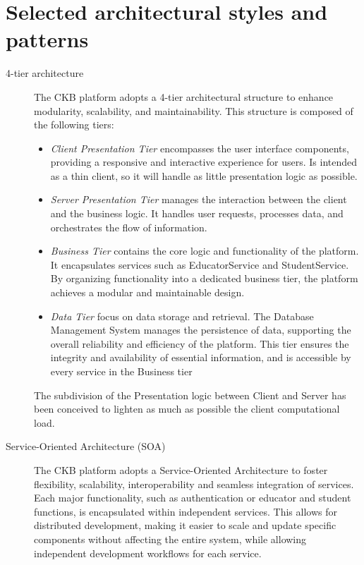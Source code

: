 \documentclass[11pt]{report}
\begin{document}
\section{Selected architectural styles and patterns} \label{sec:architectural_styles}
\begin{description}
    \item[4-tier architecture]
    The CKB platform adopts a 4-tier architectural structure to enhance modularity, scalability, and maintainability.
    This structure is composed of the following tiers:
    \begin{itemize}
        \item[1°] \emph{Client Presentation Tier} encompasses the user interface components, providing a responsive and interactive experience for users.
        Is intended as a thin client, so it will handle as little presentation logic as possible.
        \item[2°] \emph{Server Presentation Tier} manages the interaction between the client and the business logic.
        It handles user requests, processes data, and orchestrates the flow of information.
        \item[3°] \emph{Business Tier} contains the core logic and functionality of the platform.
        It encapsulates services such as EducatorService and StudentService.
        By organizing functionality into a dedicated business tier, the platform achieves a modular and maintainable design.
        \item[4°] \emph{Data Tier} focus on data storage and retrieval.
        The Database Management System manages the persistence of data, supporting the overall reliability and efficiency of the platform.
        This tier ensures the integrity and availability of essential information, and is accessible by every service in the Business tier
    \end{itemize}
    The subdivision of the Presentation logic between Client and Server has been conceived to lighten as much as possible the client computational load.

    \item[Service-Oriented Architecture (SOA)]
    The CKB platform adopts a Service-Oriented Architecture to foster flexibility, scalability, interoperability and seamless integration of services.
    Each major functionality, such as authentication or educator and student functions, is encapsulated within independent services.
    This allows for distributed development, making it easier to scale and update specific components without affecting the entire system, while allowing independent development workflows for each service.
\end{description}
\end{document}

